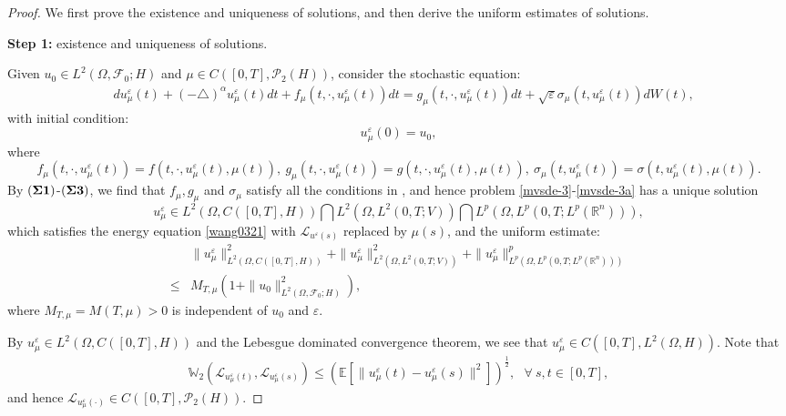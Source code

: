 \documentclass[11pt]{article}
\numberwithin{equation}{section}
\theoremstyle{plain}
\def\leq{\leqslant}
\begin{document}
\begin{proof}
    We first prove the existence
    and uniqueness of solutions,
    and then derive the uniform
    estimates of solutions.


 {\bf Step 1:}  existence and uniqueness of solutions.


Given
$u_0 \in L^2(\Omega, \mathscr{F}_0; H)$
and   $\mu  \in C( [0,T], \mathcal{P}_2(H) )$,
    consider the    stochastic equation:
\begin{align}\label{mvsde-3}
     & d u_\mu^\varepsilon(t) + (-\triangle)^\alpha u_\mu^\varepsilon(t) dt
         + f_\mu(t, \cdot, u_\mu^\varepsilon (t) ) dt
           = g_\mu(t, \cdot, u_\mu^\varepsilon (t) ) dt
          + \sqrt{\varepsilon}
                  \sigma_\mu(t, u_\mu^\varepsilon (t) ) dW(t),
\end{align}
 with initial condition: \begin{equation}\label{mvsde-3a}
    u_\mu^\varepsilon(0) = u_0,
    \end{equation}
 where
 $$ f_\mu (t, \cdot, u_\mu^\varepsilon (t)) = f(t, \cdot,  u_\mu^\varepsilon (t), \mu(t) ),\
    g_\mu (t, \cdot, u_\mu^\varepsilon (t)) = g(t, \cdot, u_\mu^\varepsilon (t), \mu(t) ),\
    \sigma_\mu (t, u_\mu^\varepsilon (t)) = \sigma(t, u_\mu^\varepsilon (t), \mu(t) ).
 $$
 By  $({\bf \Sigma 1})$-$({\bf \Sigma 3})$, we find that
   $f_\mu, g_\mu $ and $\sigma_\mu$
 satisfy all the conditions in \cite[Theorem 6.3]{wangb2019JDE},
 and hence problem  \eqref{mvsde-3}-\eqref{mvsde-3a} has a unique solution
  $$ u_\mu^\varepsilon
     \in L^2(\Omega, C([0,T], H) )
         \bigcap
         L^2(\Omega, L^2(0,T; V) )
         \bigcap
         L^p(\Omega, L^p(0,T; L^p(\mathbb{R}^n ) ) ),
  $$
 which satisfies
 the energy equation
 \eqref{wang0321}
 with
 $\mathcal{L}_{u^\varepsilon (s)}
 $ replaced by $\mu (s)$, and
 the
  uniform estimate:
 \begin{align*}
         & \| u_\mu^\varepsilon \|_{L^2(\Omega, C([0,T], H) )}^2
           + \| u_\mu^\varepsilon \|_{L^2(\Omega, L^2(0,T; V) )}^2
           + \| u_\mu^\varepsilon \|_{L^p(\Omega, L^p(0,T; L^p(\mathbb{R}^n ) ) )}^p
                 \nonumber\\
    \leq & M_{T,\mu}
              \left( 1 + \| u_0 \|_{L^2(\Omega, \mathscr{F}_0; H)}^2
              \right),
 \end{align*}
 where $M_{T,\mu} = M (T, \mu) > 0$ is independent of $u_0$ and $\varepsilon$.

 By $u_\mu^\varepsilon \in L^2(\Omega, C([0,T], H) )$ and the Lebesgue dominated convergence theorem,
 we see that $u_\mu^\varepsilon \in  C([0,T],L^2(\Omega, H) )$.
Note that
 \begin{align*}
    \mathbb{W}_2
                 \left( \mathcal{L}_{u_\mu^\varepsilon(t)},
                               \mathcal{L}_{u_\mu^\varepsilon(s)}
                 \right)
    \leq
         \left( \mathbb{E}
                      \left[ \| u_\mu^\varepsilon(t) - u_\mu^\varepsilon(s) \|^2
                      \right]
         \right)^{ \frac{1}{2} },
             \ \ \   \forall \  s,t \in [0,T],
 \end{align*}
and hence
    $\mathcal{L}_{u_\mu^\varepsilon(\cdot)} \in C( [0,T], \mathcal{P}_2(H) )$.


\end{proof}
\end{document}
